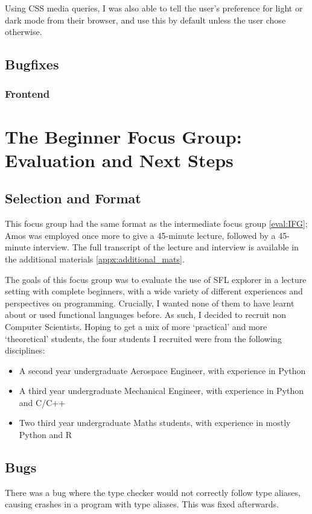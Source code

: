 Using CSS media queries, I was also able to tell the user's preference for light or dark mode from their browser, and use this by default unless the user chose otherwise. 

\subsection{Bugfixes}
\subsubsection{Frontend}

\section{The Beginner Focus Group: Evaluation and Next Steps}
\label{eval:BFG}
\subsection{Selection and Format}
This focus group had the same format as the intermediate focus group \ref{eval:IFG}; Amos was employed once more to give a 45-minute lecture, followed by a 45-minute interview. The full transcript of the lecture and interview is available in the additional materials \ref{appx:additional_mats}.

The goals of this focus group was to evaluate the use of SFL explorer in a lecture setting with complete beginners, with a wide variety of different experiences and perspectives on programming. Crucially, I wanted none of them to have learnt about or used functional languages before. As such, I decided to recruit non Computer Scientists. Hoping to get a mix of more `practical' and more `theoretical' students, the four students I recruited were from the following disciplines:

\begin{itemize}
    \item A second year undergraduate Aerospace Engineer, with experience in Python
    \item A third year undergraduate Mechanical Engineer, with experience in Python and C/C++
    \item Two third year undergraduate Maths students, with experience in mostly Python and R
\end{itemize}

\subsection{Bugs}
There was a bug where the type checker would not correctly follow type aliases, causing crashes in a program with type aliases. This was fixed afterwards. 


